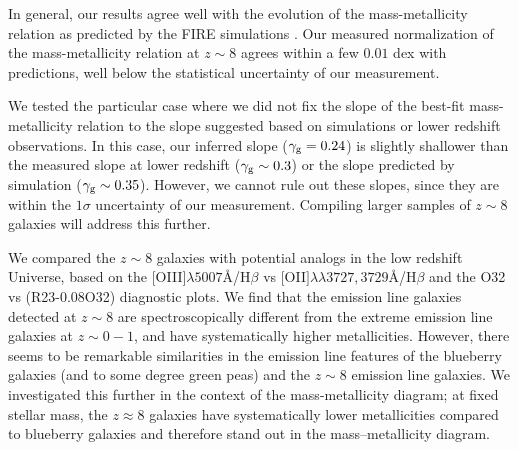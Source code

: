 \documentclass[twocolumn]{aastex631}
\begin{document}
In general, our results agree well with the evolution of the mass-metallicity relation as predicted by the FIRE simulations \citep{ma+2016}. Our measured normalization of the mass-metallicity relation at $z \sim 8$ agrees within a few $0.01$ dex with \cite{ma+2016} predictions, well below the statistical uncertainty of our measurement. 
    
We tested the particular case where we did not fix the slope of the best-fit mass-metallicity relation to the slope suggested based on simulations or lower redshift observations. In this case, our inferred slope ($\gamma_{\textnormal{\scriptsize g}} = 0.24$) is slightly shallower than the measured slope at lower redshift ($\gamma_{\textnormal{\scriptsize g}} \sim 0.3$) or the slope predicted by simulation ($\gamma_{\textnormal{\scriptsize g}} \sim 0.35$). However, we cannot rule out these slopes, since they are within the $1\sigma$ uncertainty of our measurement. Compiling larger samples of $z \sim 8$ galaxies will address this further. 
    
We compared the $z \sim 8$ galaxies with potential analogs in the low redshift Universe, based on the $[$O{\footnotesize\;III}$]\lambda 5007$\AA/H$\beta$ vs $[$O{\footnotesize\;II}$]\lambda \lambda 3727, 3729$\AA/H$\beta$ and the O32 vs (R23-0.08O32) diagnostic plots. We find that the emission line galaxies detected at $z \sim 8$ are spectroscopically different from the extreme emission line galaxies at $z \sim 0-1$, and have systematically higher metallicities. However, there seems to be remarkable similarities in the emission line features of the blueberry galaxies (and to some degree green peas) and the $z \sim 8$ emission line galaxies. We investigated this further in the context of the mass-metallicity diagram; at fixed stellar mass, the $z \approx 8$ galaxies have systematically lower metallicities compared to blueberry galaxies and therefore stand out in the mass--metallicity diagram. 
\end{document}

